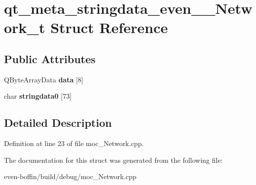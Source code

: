 \hypertarget{structqt__meta__stringdata__even_____network__t}{}\section{qt\+\_\+meta\+\_\+stringdata\+\_\+even\+\_\+\+\_\+\+Network\+\_\+t Struct Reference}
\label{structqt__meta__stringdata__even_____network__t}
\subsection*{Public Attributes}
\begin{DoxyCompactItemize}
\item 
\mbox{\label{structqt__meta__stringdata__even_____network__t_ac5bebd23b46f71bd3d0caa5f0d2eb8fe}} 
Q\+Byte\+Array\+Data {\bfseries data} \mbox{[}8\mbox{]}
\item 
\mbox{\label{structqt__meta__stringdata__even_____network__t_a2a8a93f7b756e7495aa6303cec874fb3}} 
char {\bfseries stringdata0} \mbox{[}73\mbox{]}
\end{DoxyCompactItemize}


\subsection{Detailed Description}


Definition at line 23 of file moc\+\_\+\+Network.\+cpp.



The documentation for this struct was generated from the following file\+:\begin{DoxyCompactItemize}
\item 
even-\/boffin/build/debug/moc\+\_\+\+Network.\+cpp\end{DoxyCompactItemize}
